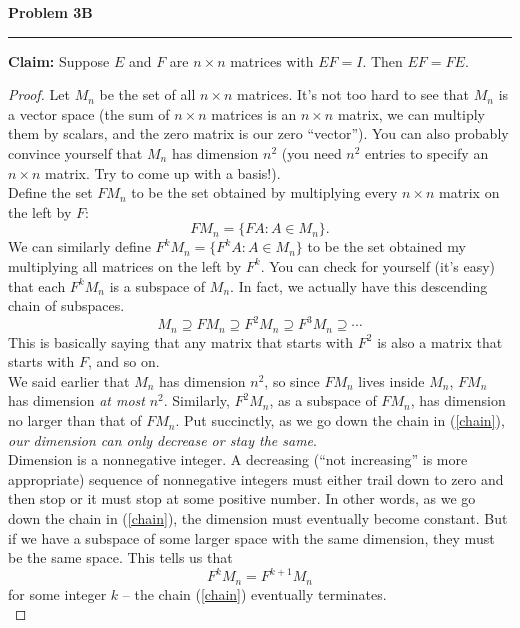 \documentclass[12pt]{article}
\begin{document}
\begin{center}
{\bf \Large Problem 3B}
\vspace{0.2cm}
\hrule
\end{center}

\noindent\textbf{Claim: }Suppose $E$ and $F$ are $n\times n$ matrices with $EF = I$. Then $EF = FE$.
\begin{proof}
	Let $M_n$ be the set of all $n\times n$ matrices. It's not too hard to see that $M_n$ is a vector space (the sum of $n\times n$ matrices is an $n\times n$ matrix, we can multiply them by scalars, and the zero matrix is our zero ``vector''). You can also probably convince yourself that $M_n$ has dimension $n^2$ (you need $n^2$ entries to specify an $n\times n$ matrix. Try to come up with a basis!).\\

	\noindent Define the set $FM_n$ to be the set obtained by multiplying every $n\times n$ matrix on the left by $F$:
	\[
	FM_n = \{FA: A\in M_n\}.
	\]
	We can similarly define $F^kM_n = \{F^kA: A\in M_n\}$ to be the set obtained my multiplying all matrices on the left by $F^k$. You can check for yourself (it's easy) that each $F^kM_n$ is a subspace of $M_n$. In fact, we actually have this descending chain of subspaces.
	\begin{equation}\label{chain}
	M_n \supseteq FM_n\supseteq F^2M_n\supseteq F^3M_n\supseteq \cdots
	\end{equation}
	This is basically saying that any matrix that starts with $F^2$ is also a matrix that starts with $F$, and so on.\\

	\noindent We said earlier that $M_n$ has dimension $n^2$, so since $FM_n$ lives inside $M_n$, $FM_n$ has dimension \textit{at most} $n^2$. Similarly, $F^2M_n$, as a subspace of $FM_n$, has dimension no larger than that of $FM_n$. Put succinctly, as we go down the chain in (\ref{chain}), \textit{our dimension can only decrease or stay the same}.\\

	\noindent Dimension is a nonnegative integer. A decreasing (``not increasing'' is more appropriate) sequence of nonnegative integers must either trail down to zero and then stop or it must stop at some positive number. In other words, as we go down the chain in (\ref{chain}), the dimension must eventually become constant. But if we have a subspace of some larger space with the same dimension, they must be the same space. This tells us that
	\begin{equation}\label{terminate}
	F^kM_n = F^{k+1}M_n
	\end{equation}
	for some integer $k$ -- the chain (\ref{chain}) eventually terminates.\\


\end{proof}
\end{document}
